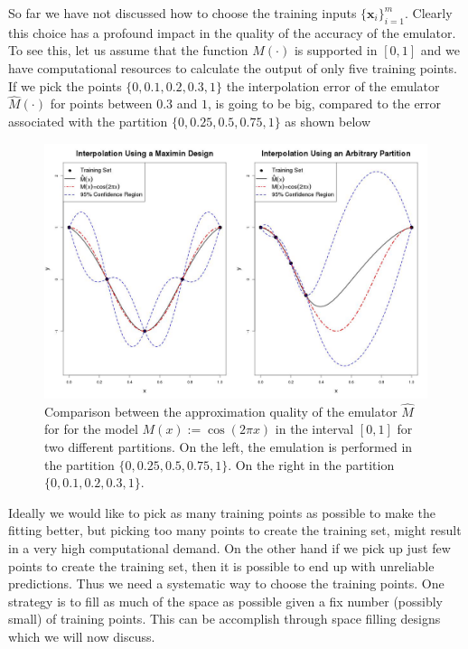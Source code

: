 \documentclass[12pt]{book}
\newcommand{\x}{\textbf{x}}
\begin{document}
So far we have not discussed  how to choose the training inputs $\{\x_{i}\}_{i=1}^{m}$. 
Clearly this choice has a profound  impact in the quality of the accuracy of the emulator.
To see this, let us assume that the function $M(\cdot)$ is supported in $[0,1]$ and we  have
computational resources to calculate the output of only five training
points. If we pick the points $\{0,0.1,0.2,0.3,1\}$ the interpolation error of the emulator
$\widehat{M}(\cdot)$  for points between $0.3$ and $1$, 
is going to be big, compared to the error associated with the partition $\{0,0.25,0.5,0.75,1\}$ as
shown below
\begin{figure}[H]
\raggedleft
\includegraphics[scale=0.33]{./FigChap2/partitionComparison}
\caption{Comparison between the approximation quality of the emulator $\widehat{M}$ for 
for the model $M(x):=\cos(2\pi x)$ in the interval $[0,1]$ for two different partitions. 
On the left, the emulation is performed in the partition $\{0,0.25,0.5,0.75,1\}$. On
the right in the partition $\{0,0.1,0.2,0.3,1\}$.}
\label{figChp2}
\end{figure}
 




Ideally we would like to pick as many training points as possible to make the fitting better, 
but picking too many points
to create the training set, might result in a very high computational demand. On the other hand if we pick up
just few points to create the training set, then it is possible to end up with unreliable predictions. 
Thus we need a systematic way to choose  the training points. One strategy is to  
 fill as much of the space as possible given a fix number (possibly small) of  training points. 
This can be accomplish
through    space filling designs which we will now discuss. 
\newline
\end{document}
